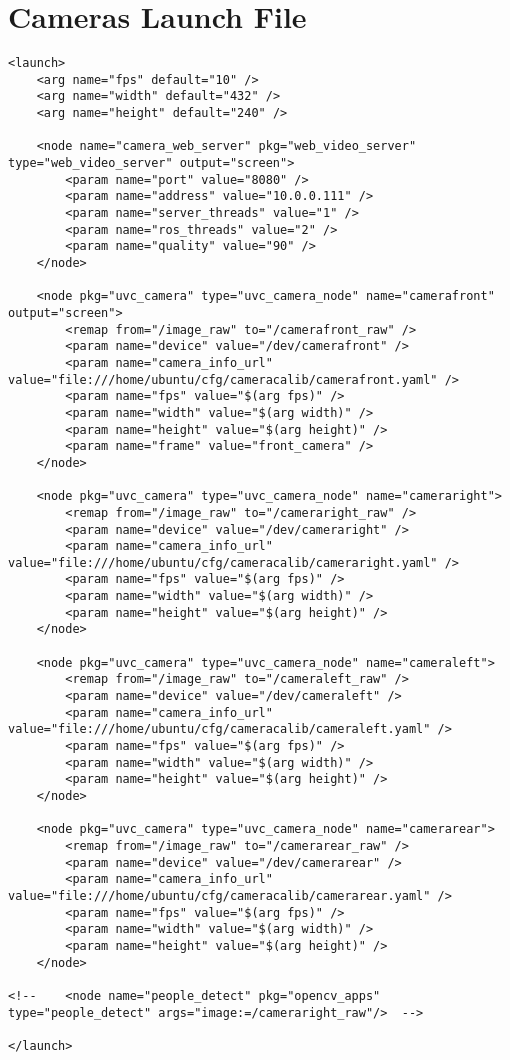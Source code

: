 \section*{Cameras Launch File}
\begin{lstlisting}[breaklines=true,basicstyle=\tiny]
<launch>
	<arg name="fps" default="10" />	
	<arg name="width" default="432" />	
	<arg name="height" default="240" />	

	<node name="camera_web_server" pkg="web_video_server"  type="web_video_server" output="screen">
		<param name="port" value="8080" />
		<param name="address" value="10.0.0.111" />
		<param name="server_threads" value="1" />
		<param name="ros_threads" value="2" />
		<param name="quality" value="90" />
	</node>

	<node pkg="uvc_camera" type="uvc_camera_node" name="camerafront" output="screen">
		<remap from="/image_raw" to="/camerafront_raw" />
		<param name="device" value="/dev/camerafront" />
		<param name="camera_info_url" value="file:///home/ubuntu/cfg/cameracalib/camerafront.yaml" />
		<param name="fps" value="$(arg fps)" />
		<param name="width" value="$(arg width)" />
		<param name="height" value="$(arg height)" />
		<param name="frame" value="front_camera" />
	</node>

	<node pkg="uvc_camera" type="uvc_camera_node" name="cameraright">
		<remap from="/image_raw" to="/cameraright_raw" />
		<param name="device" value="/dev/cameraright" />
		<param name="camera_info_url" value="file:///home/ubuntu/cfg/cameracalib/cameraright.yaml" />
		<param name="fps" value="$(arg fps)" />
		<param name="width" value="$(arg width)" />
		<param name="height" value="$(arg height)" />
	</node>

	<node pkg="uvc_camera" type="uvc_camera_node" name="cameraleft">
		<remap from="/image_raw" to="/cameraleft_raw" />
		<param name="device" value="/dev/cameraleft" />
		<param name="camera_info_url" value="file:///home/ubuntu/cfg/cameracalib/cameraleft.yaml" />
		<param name="fps" value="$(arg fps)" />
		<param name="width" value="$(arg width)" />
		<param name="height" value="$(arg height)" />
	</node>

	<node pkg="uvc_camera" type="uvc_camera_node" name="camerarear">
		<remap from="/image_raw" to="/camerarear_raw" />
		<param name="device" value="/dev/camerarear" />
		<param name="camera_info_url" value="file:///home/ubuntu/cfg/cameracalib/camerarear.yaml" />
		<param name="fps" value="$(arg fps)" />
		<param name="width" value="$(arg width)" />
		<param name="height" value="$(arg height)" />
	</node>

<!--	<node name="people_detect" pkg="opencv_apps" type="people_detect" args="image:=/cameraright_raw"/>  -->

</launch>
\end{lstlisting}

